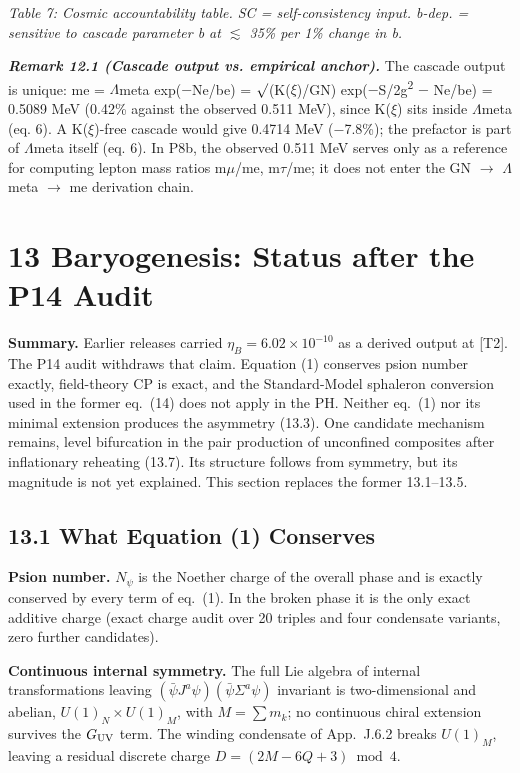 \documentclass[11pt,letterpaper]{article}
\begin{document}
\begingroup\centering\footnotesize\itshape Table 7: Cosmic accountability table. SC = self-consistency input. b-dep. = sensitive to cascade parameter b at $\lesssim$ 35\% per 1\% change in b.\par\endgroup

\noindent \textbf{\textit{Remark 12.1 (Cascade output vs. empirical anchor). }}The cascade output is unique: me = $\Lambda$meta exp($-$Ne/be) = $\surd$(K($\xi$)/GN) exp($-$S/2g\textsuperscript{2} $-$ Ne/be) = 0.5089 MeV (0.42\% against the observed 0.511 MeV), since K($\xi$) sits inside $\Lambda$meta (eq. 6). A K($\xi$)-free cascade would give 0.4714 MeV ($-$7.8\%); the prefactor is part of $\Lambda$meta itself (eq. 6). In P8b, the observed 0.511 MeV serves only as a reference for computing lepton mass ratios m$\mu$/me, m$\tau$/me; it does not enter the GN $\to$ $\Lambda$meta $\to$ me derivation chain.

\section*{13  Baryogenesis: Status after the P14 Audit}

\noindent \textbf{Summary. }Earlier releases carried $\eta_B = 6.02\times10^{-10}$ as a derived output at [T2]. The P14 audit withdraws that claim. Equation (1) conserves psion number exactly, field-theory CP is exact, and the Standard-Model sphaleron conversion used in the former eq.~(14) does not apply in the PH. Neither eq.~(1) nor its minimal extension produces the asymmetry (13.3). One candidate mechanism remains, level bifurcation in the pair production of unconfined composites after inflationary reheating (13.7). Its structure follows from symmetry, but its magnitude is not yet explained. This section replaces the former 13.1--13.5.

\subsection*{13.1  What Equation (1) Conserves}

\noindent \textbf{Psion number. }$N_\psi$ is the Noether charge of the overall phase and is exactly conserved by every term of eq.~(1). In the broken phase it is the only exact additive charge (exact charge audit over 20 triples and four condensate variants, zero further candidates).

\noindent \textbf{Continuous internal symmetry. }The full Lie algebra of internal transformations leaving $(\bar\psi J^a\psi)(\bar\psi\Sigma^a\psi)$ invariant is two-dimensional and abelian, $U(1)_N\times U(1)_M$, with $M=\sum m_k$; no continuous chiral extension survives the $G_{\rm UV}$ term. The winding condensate of App.~J.6.2 breaks $U(1)_M$, leaving a residual discrete charge $D=(2M-6Q+3)\bmod 4$.
\end{document}
